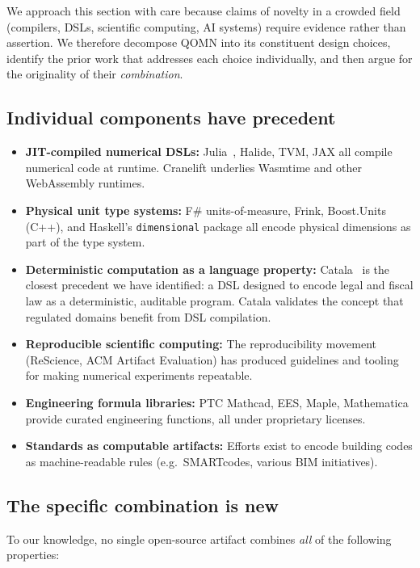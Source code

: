 \documentclass[11pt,a4paper]{article}
\begin{document}
We approach this section with care because claims of novelty in a crowded field (compilers, DSLs, scientific computing, AI systems) require evidence rather than assertion. We therefore decompose QOMN into its constituent design choices, identify the prior work that addresses each choice individually, and then argue for the originality of their \emph{combination}.

\subsection{Individual components have precedent}

\begin{itemize}[leftmargin=*]
\item \textbf{JIT-compiled numerical DSLs:} Julia~\cite{julia}, Halide, TVM, JAX all compile numerical code at runtime. Cranelift underlies Wasmtime and other WebAssembly runtimes.
\item \textbf{Physical unit type systems:} F\# units-of-measure, Frink, Boost.Units (C++), and Haskell's \texttt{dimensional} package all encode physical dimensions as part of the type system.
\item \textbf{Deterministic computation as a language property:} Catala~\cite{catala} is the closest precedent we have identified: a DSL designed to encode legal and fiscal law as a deterministic, auditable program. Catala validates the concept that regulated domains benefit from DSL compilation.
\item \textbf{Reproducible scientific computing:} The reproducibility movement (ReScience, ACM Artifact Evaluation) has produced guidelines and tooling for making numerical experiments repeatable.
\item \textbf{Engineering formula libraries:} PTC Mathcad, EES, Maple, Mathematica provide curated engineering functions, all under proprietary licenses.
\item \textbf{Standards as computable artifacts:} Efforts exist to encode building codes as machine-readable rules (e.g.\ SMARTcodes, various BIM initiatives).
\end{itemize}

\subsection{The specific combination is new}

To our knowledge, no single open-source artifact combines \emph{all} of the following properties:
\end{document}
